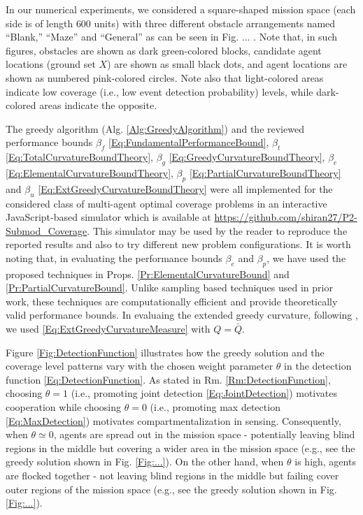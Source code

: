 \documentclass[letterpaper, 10 pt, conference]{ieeeconf}
\begin{document}


In our numerical experiments, we considered a square-shaped mission space (each side is of length $600$ units) with three different obstacle arrangements named ``Blank,'' ``Maze'' and ``General'' as can be seen in Fig. ... . Note that, in such figures, obstacles are shown as dark green-colored blocks, candidate agent locations (ground set $X$) are shown as small black dots, and agent locations are shown as numbered pink-colored circles. Note also that light-colored areas indicate low coverage (i.e., low event detection probability) levels, while dark-colored areas indicate the opposite. 

The greedy algorithm (Alg. \ref{Alg:GreedyAlgorithm}) and the reviewed performance bounds $\beta_f$ \eqref{Eq:FundamentalPerformanceBound}, $\beta_t$ \eqref{Eq:TotalCurvatureBoundTheory}, $\beta_g$ \eqref{Eq:GreedyCurvatureBoundTheory}, $\beta_e$ \eqref{Eq:ElementalCurvatureBoundTheory}, $\beta_p$ \eqref{Eq:PartialCurvatureBoundTheory} and $\beta_u$ \eqref{Eq:ExtGreedyCurvatureBoundTheory} were all implemented for the considered class of multi-agent optimal coverage problems in an interactive JavaScript-based simulator which is available at \url{https://github.com/shiran27/P2-Submod_Coverage}. This simulator may be used by the reader to reproduce the reported results and also to try different new problem configurations. It is worth noting that, in evaluating the performance bounds $\beta_e$ and $\beta_p$, we have used the proposed techniques in Props. \ref{Pr:ElementalCurvatureBound} and \ref{Pr:PartialCurvatureBound}. Unlike sampling based techniques used in prior work, these techniques are computationally efficient and provide theoretically valid performance bounds. In evaluaing the extended greedy curvature, following \cite{WelikalaJ02021}, we used \eqref{Eq:ExtGreedyCurvatureMeasure} with $Q=\bar{Q}$.


Figure \ref{Fig:DetectionFunction} illustrates how the greedy solution and the coverage level patterns vary with the chosen weight parameter $\theta$ in the detection function \eqref{Eq:DetectionFunction}. As stated in Rm. \ref{Rm:DetectionFunction}, choosing $\theta=1$ (i.e., promoting joint detection \eqref{Eq:JointDetection}) motivates cooperation while choosing $\theta=0$ (i.e., promoting max detection \eqref{Eq:MaxDetection}) motivates compartmentalization in sensing. Consequently, when $\theta \simeq 0$, agents are spread out in the mission space - potentially leaving blind regions in the middle but covering a wider area in the mission space (e.g., see the greedy solution shown in Fig. \ref{Fig:...}). On the other hand, when $\theta$ is high, agents are flocked together - not leaving blind regions in the middle but failing cover outer regions of the mission space (e.g., see the greedy solution shown in Fig. \ref{Fig:...}). 
\end{document}
